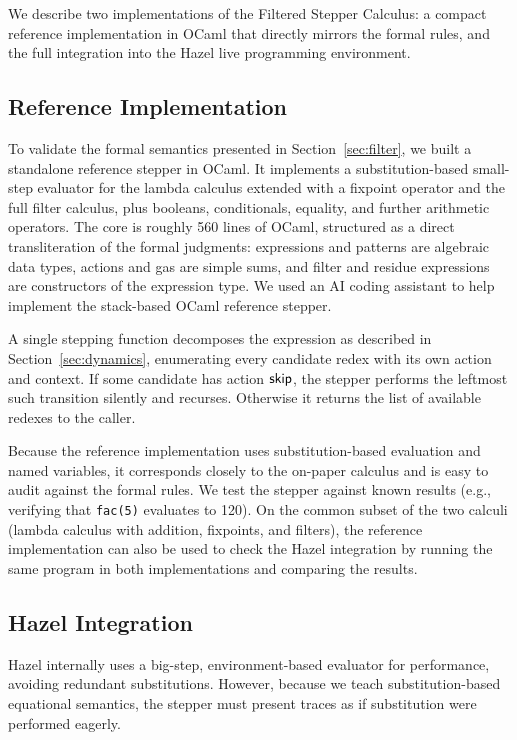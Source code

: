 
We describe two implementations of the Filtered Stepper Calculus: a
compact reference implementation in OCaml that directly mirrors the
formal rules, and the full integration into the Hazel live programming
environment.

\subsection{Reference Implementation}\label{sec:impl-mini}

To validate the formal semantics presented in Section~\ref{sec:filter},
we built a standalone reference stepper in OCaml. It implements a
substitution-based small-step evaluator for the lambda
calculus extended with a fixpoint operator and the full filter calculus,
plus booleans, conditionals, equality, and further arithmetic operators.
The core is roughly 560 lines of OCaml, structured as a direct
transliteration of the formal judgments: expressions and patterns are
algebraic data types, actions and gas are simple sums, and filter and
residue expressions are constructors of the expression type.
We used an AI coding assistant to help implement the stack-based OCaml
reference stepper.

A single stepping function decomposes the expression as described in
Section~\ref{sec:dynamics}, enumerating every candidate redex with its
own action and context. If some candidate has action \(\mathsf{skip}\), the
stepper performs the leftmost such transition silently and recurses.
Otherwise it returns the list of available redexes to the caller.

Because the reference implementation uses substitution-based evaluation
and named variables, it corresponds closely to the on-paper calculus and
is easy to audit against the formal rules. We test the stepper against
known results (e.g., verifying that \texttt{fac(5)} evaluates to 120).
On the common subset of the two calculi (lambda calculus with addition,
fixpoints, and filters), the reference implementation can also be used
to check the Hazel integration by running the same program in both
implementations and comparing the results.

\subsection{Hazel Integration}\label{sec:impl-hazel}

Hazel internally uses a big-step, environment-based evaluator for
performance, avoiding redundant substitutions. However, because we 
teach substitution-based equational semantics, the stepper must present 
traces as if substitution were performed eagerly.

